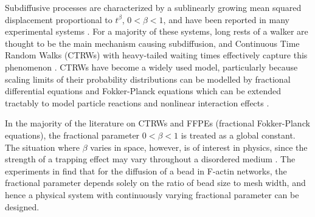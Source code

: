 \documentclass[a4paper,12pt]{elsarticle}
\numberwithin{equation}{section}
\theoremstyle{plain}
\theoremstyle{definition}
\theoremstyle{remark}
\numberwithin{equation}{section}
\newcommand{\1}{\mathbf 1}
\begin{document}
Subdiffusive processes are characterized by a sublinearly growing mean squared
displacement proportional to $t^\beta$, $0 < \beta < 1$, and have been reported
in many experimental systems
\cite{Metzler2000,TMT04,Santamaria2006a,Banks2005,Regner2013}.
For a majority of these systems, long rests of a walker are thought to be the
main mechanism causing subdiffusion, and Continuous Time Random Walks (CTRWs)
with heavy-tailed waiting times effectively capture this phenomenon
\cite{Scher1975,BG1990,Metzler2000}.  CTRWs have become a widely used model,
particularly because scaling limits of their probability distributions can be
modelled by fractional differential equations and Fokker-Planck equations
\cite{BMK00,Baeumer2001,HLS10PRL,Hahn11} which can be extended tractably to
model particle reactions \cite{Langlands2008d,Angstmann2013} and nonlinear
interaction effects \cite{StrakaFedotov14}.

In the majority of the literature on CTRWs and FFPEs (fractional Fokker-Planck
equations), the
fractional parameter $0 < \beta < 1$ is treated as a global constant.  The
situation where $\beta$ varies in space, however, is of interest in physics,
since the strength of a trapping effect may vary throughout a disordered
medium
\cite{Wong04,Chechkin2005a,Korabel2010,Stickler2011,Fedotov2012,StrakaFedotov14}.
The experiments in \cite{Wong04} find that for the diffusion of a bead in
F-actin networks, the fractional parameter depends solely on the ratio of
bead size to mesh width, and hence a physical system with continuously varying
fractional parameter can be designed.
\end{document}
